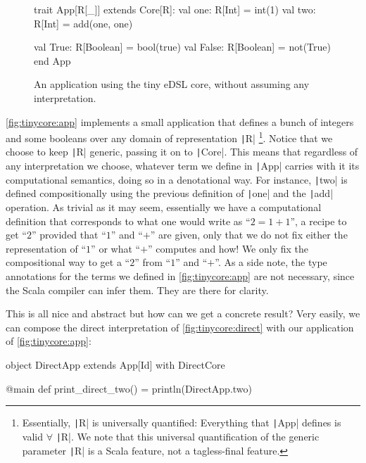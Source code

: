 \documentclass[11pt]{article}
\renewcommand{\vref}[1]{\autoref{#1} \vpageref{#1}}{}
\newcommand{\ScalaI}[1]{\texttt|#1|}
\begin{document}
\begin{figure}[t]
\begin{ScalaBlock}
trait App[R[_]] extends Core[R]:
  val one: R[Int] = int(1)
  val two: R[Int] = add(one, one)
  
  val True: R[Boolean] = bool(true)
  val False: R[Boolean] = not(True)
end App
\end{ScalaBlock}
\caption{An application using the tiny eDSL core, without assuming any interpretation.}
\label{fig:tinycore:app}
\hrulefill
\end{figure}

\vref{fig:tinycore:app} implements a small application that defines a bunch of integers and some booleans over any domain of representation \ScalaI{R}%
\footnote{Essentially, \ScalaI{R} is universally quantified: Everything that 
\ScalaI{App} defines is valid $\forall$ \ScalaI{R}. We note that this 
universal quantification of the generic parameter \ScalaI{R} is a Scala 
feature, not a tagless-final feature.}. Notice that we choose to keep 
\ScalaI{R} generic, passing it on to \ScalaI{Core}. This means that 
regardless of any interpretation we choose, whatever term we define in 
\ScalaI{App} carries with it its computational semantics, doing so in a 
denotational way. For instance, \ScalaI{two} is defined compositionally using 
the previous definition of \ScalaI{one} and the \ScalaI{add} operation. As 
trivial as it may seem, essentially we have a computational definition that 
corresponds to what one would write as ``$2 = 1 + 1$'', a recipe to get 
``$2$'' provided that ``$1$'' and ``$+$'' are given, only that we do not fix 
either the representation of ``$1$'' or what ``$+$'' computes and how! We 
only fix the compositional way to get a ``$2$'' from ``$1$'' and ``$+$''. As 
a side note, the type annotations for the terms we defined in 
\autoref{fig:tinycore:app} are not necessary, since the Scala compiler can 
infer them. They are there for clarity.

This is all nice and abstract but how can we get a concrete result? Very 
easily, we can compose the direct interpretation of 
\autoref{fig:tinycore:direct} with our application of 
\autoref{fig:tinycore:app}:

\begin{ScalaBlockSimple}
object DirectApp extends App[Id] with DirectCore

@main def print_direct_two() = println(DirectApp.two)
\end{ScalaBlockSimple}
\end{document}
